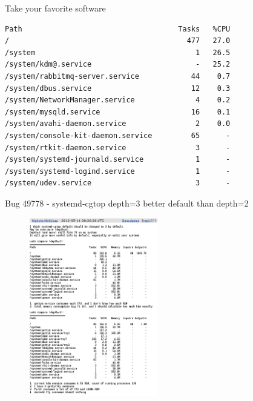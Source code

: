 \documentclass{beamer}
\begin{document}
\begin{frame}[fragile]{Take your favorite software}
    \pause
    \begin{verbatim}
Path                                    Tasks   %CPU
/                                         477   27.0
/system                                     1   26.5
/system/kdm@.service                        -   25.2
/system/rabbitmq-server.service            44    0.7
/system/dbus.service                       12    0.3
/system/NetworkManager.service              4    0.2
/system/mysqld.service                     16    0.1
/system/avahi-daemon.service                2    0.0
/system/console-kit-daemon.service         65      -
/system/rtkit-daemon.service                3      -
/system/systemd-journald.service            1      -
/system/systemd-logind.service              1      -
/system/udev.service                        3      -
    \end{verbatim}
\end{frame}

\begin{frame}[fragile]{Bug 49778 - systemd-cgtop depth=3 better default than depth=2}
    \begin{figure}[htb]
        \includegraphics[width=0.5\textwidth]{bug.png}
    \end{figure}
\end{frame}
\end{document}
